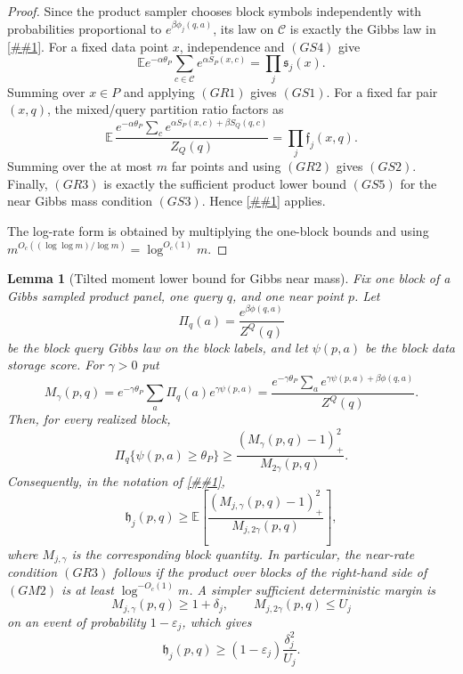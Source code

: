 \documentclass[10pt]{article}
\newcommand{\cref}[1]{\ref{##1}}
\newtheorem{lemma}[theorem]{Lemma}
\theoremstyle{definition}
\newcommand{\E}{\mathbb{E}}
\begin{document}
\begin{proof}
   Since the product sampler chooses block symbols independently with
   probabilities proportional to \(e^{\beta\phi_j(q,a)}\), its law on
   \(\mathcal C\) is exactly the Gibbs law in
   \cref{cor:gibbs-sampled-product-panel}.  For a fixed data point \(x\),
   independence and \((GS4)\) give
   \[
      \E e^{-\alpha\theta_P}
      \sum_{c\in\mathcal C}e^{\alpha S_P(x,c)}
      =
      \prod_j\mathfrak s_j(x).
   \]
   Summing over \(x\in P\) and applying \((GR1)\) gives \((GS1)\).  For a
   fixed far pair \((x,q)\), the mixed/query partition ratio factors as
   \[
      \E\,
      \frac{
         e^{-\alpha\theta_P}
         \sum_c e^{\alpha S_P(x,c)+\beta S_Q(q,c)}
      }{Z_Q(q)}
      =
      \prod_j\mathfrak f_j(x,q).
   \]
   Summing over the at most \(m\) far points and using \((GR2)\) gives
   \((GS2)\).  Finally, \((GR3)\) is exactly the sufficient product lower bound
   \((GS5)\) for the near Gibbs mass condition \((GS3)\).  Hence
   \cref{cor:gibbs-sampled-product-panel} applies.

   The log-rate form is obtained by multiplying the one-block bounds and using
   \(m^{O_c((\log\log m)/\log m)}=\log^{O_c(1)}m\).
\end{proof}

\begin{lemma}[Tilted moment lower bound for Gibbs near mass]
   \label{lem:gibbs-near-moment-lower-bound}
   Fix one block of a Gibbs sampled product panel, one query \(q\), and one
   near point \(p\).  Let
   \[
      \Pi_q(a)=\frac{e^{\beta\phi(q,a)}}{Z^Q(q)}
   \]
   be the block query Gibbs law on the block labels, and let
   \(\psi(p,a)\) be the block data storage score.  For \(\gamma>0\) put
   \[
      M_\gamma(p,q)
      =
      e^{-\gamma\theta_P}
      \sum_a\Pi_q(a)e^{\gamma\psi(p,a)}
      =
      \frac{
         e^{-\gamma\theta_P}
         \sum_a e^{\gamma\psi(p,a)+\beta\phi(q,a)}
      }{Z^Q(q)} .
   \]
   Then, for every realized block,
   \[
      \Pi_q\{\psi(p,a)\ge\theta_P\}
      \ge
      \frac{(M_\gamma(p,q)-1)_+^2}{M_{2\gamma}(p,q)}.
      \tag{GM1}
   \]
   Consequently, in the notation of
   \cref{cor:gibbs-sampled-rate-bookkeeping},
   \[
      \mathfrak h_j(p,q)
      \ge
      \E\left[
      \frac{(M_{j,\gamma}(p,q)-1)_+^2}{M_{j,2\gamma}(p,q)}
      \right],
      \tag{GM2}
   \]
   where \(M_{j,\gamma}\) is the corresponding block quantity.  In
   particular, the near-rate condition \((GR3)\) follows if the product over
   blocks of the right-hand side of \((GM2)\) is at least
   \(\log^{-O_c(1)}m\).  A simpler sufficient deterministic margin is
   \[
      M_{j,\gamma}(p,q)\ge 1+\delta_j,
      \qquad
      M_{j,2\gamma}(p,q)\le U_j
   \]
   on an event of probability \(1-\varepsilon_j\), which gives
   \[
      \mathfrak h_j(p,q)
      \ge
      (1-\varepsilon_j)\frac{\delta_j^2}{U_j}.
   \]
\end{lemma}
\end{document}
